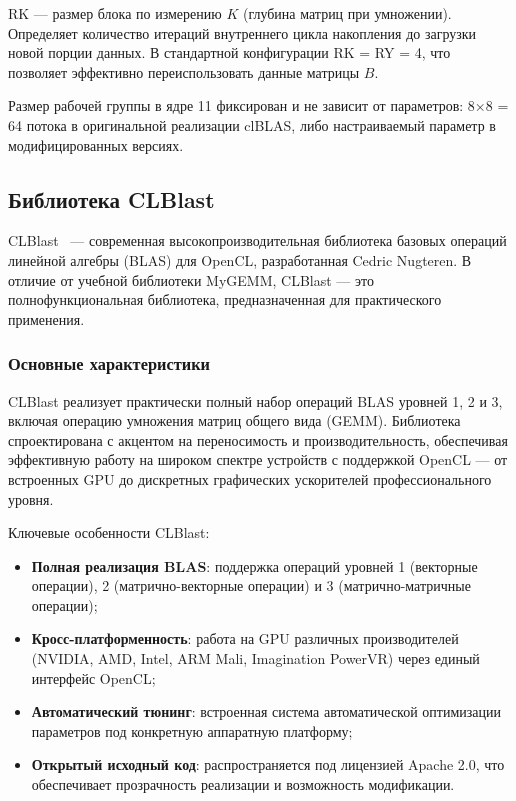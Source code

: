 RK --- размер блока по измерению $K$ (глубина матриц при умножении). Определяет количество итераций внутреннего цикла накопления до загрузки новой порции данных. В стандартной конфигурации RK = RY = 4, что позволяет эффективно переиспользовать данные матрицы $B$.

Размер рабочей группы в ядре 11 фиксирован и не зависит от параметров: 8×8 = 64 потока в оригинальной реализации clBLAS, либо настраиваемый параметр в модифицированных версиях.

\subsection{Библиотека CLBlast}

CLBlast~\cite{clblast} --- современная высокопроизводительная библиотека базовых операций линейной алгебры (BLAS) для OpenCL, разработанная Cedric Nugteren. В отличие от учебной библиотеки MyGEMM, CLBlast — это полнофункциональная библиотека, предназначенная для практического применения.

\subsubsection{Основные характеристики}

CLBlast реализует практически полный набор операций BLAS уровней 1, 2 и 3, включая операцию умножения матриц общего вида (GEMM). Библиотека спроектирована с акцентом на переносимость и производительность, обеспечивая эффективную работу на широком спектре устройств с поддержкой OpenCL --- от встроенных GPU до дискретных графических ускорителей профессионального уровня.

Ключевые особенности CLBlast:

\begin{itemize}
    \item \textbf{Полная реализация BLAS}: поддержка операций уровней 1 (векторные операции), 2 (матрично-векторные операции) и 3 (матрично-матричные операции);
    \item \textbf{Кросс-платформенность}: работа на GPU различных производителей (NVIDIA, AMD, Intel, ARM Mali, Imagination PowerVR) через единый интерфейс OpenCL;
    \item \textbf{Автоматический тюнинг}: встроенная система автоматической оптимизации параметров под конкретную аппаратную платформу;
    \item \textbf{Открытый исходный код}: распространяется под лицензией Apache 2.0, что обеспечивает прозрачность реализации и возможность модификации.
\end{itemize}

